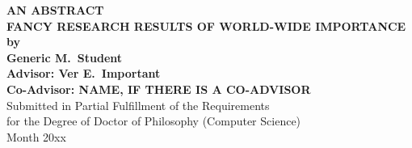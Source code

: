 \vspace*{3ex plus 0.6fil}
\begin{center}

{\large\bf
   AN ABSTRACT\\[3ex]
   FANCY RESEARCH RESULTS OF WORLD-WIDE IMPORTANCE\\[2ex]
   by\\[3ex]
   Generic M.\ Student\\[3ex]
   Advisor: Ver E.\ Important\\[2ex]
   Co-Advisor: NAME, IF THERE IS A CO-ADVISOR
}\\[3ex]
Submitted in Partial Fulfillment of the Requirements\\[2ex]
for the Degree of Doctor of Philosophy (Computer Science)\\[3ex]
Month 20xx
\end{center}

\vspace*{2.5ex}

\lipsum[2-4]

\vspace*{3ex plus 1fil}

